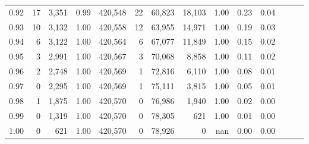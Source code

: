 \begin{tabular}{rrrrrrrrrrrrrr}
0.92 &     17 &  3,351 &  0.99 &  420,548 &       22 &  60,823 &  18,103 &  1.00 &  0.23 &      0.04 \\
0.93 &     10 &  3,132 &  1.00 &  420,558 &       12 &  63,955 &  14,971 &  1.00 &  0.19 &      0.03 \\
0.94 &      6 &  3,122 &  1.00 &  420,564 &        6 &  67,077 &  11,849 &  1.00 &  0.15 &      0.02 \\
0.95 &      3 &  2,991 &  1.00 &  420,567 &        3 &  70,068 &   8,858 &  1.00 &  0.11 &      0.02 \\
0.96 &      2 &  2,748 &  1.00 &  420,569 &        1 &  72,816 &   6,110 &  1.00 &  0.08 &      0.01 \\
0.97 &      0 &  2,295 &  1.00 &  420,569 &        1 &  75,111 &   3,815 &  1.00 &  0.05 &      0.01 \\
0.98 &      1 &  1,875 &  1.00 &  420,570 &        0 &  76,986 &   1,940 &  1.00 &  0.02 &      0.00 \\
0.99 &      0 &  1,319 &  1.00 &  420,570 &        0 &  78,305 &     621 &  1.00 &  0.01 &      0.00 \\
1.00 &      0 &    621 &  1.00 &  420,570 &        0 &  78,926 &       0 &   nan &  0.00 &      0.00 \\
\bottomrule
\end{tabular}
